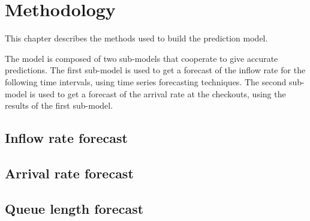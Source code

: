 \chapter{Methodology}
\label{cha:methodology}

This chapter describes the methods used to build the prediction model.

The model is composed of two sub-models that cooperate to give accurate predictions. The first sub-model is used to get a forecast of the inflow rate for the following time intervals, using time series forecasting techniques. The second sub-model is used to get a forecast of the arrival rate at the checkouts, using the results of the first sub-model.

\section{Inflow rate forecast}
\label{sec:inflow_rate_forecast}

\section{Arrival rate forecast}
\label{sec:arrival_rate_forecast}

\section{Queue length forecast}
\label{sec:queue_length_forecasting}